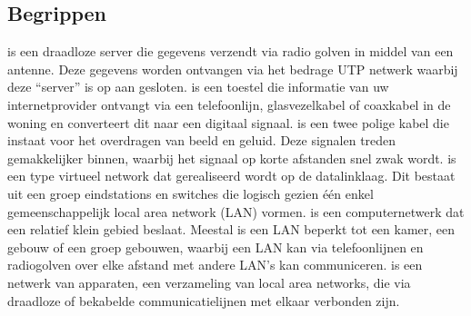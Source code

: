 \subsection{Begrippen}
 is een draadloze server die gegevens verzendt via radio golven in middel van een antenne. Deze gegevens worden ontvangen via het bedrage UTP netwerk waarbij deze “server” is op aan gesloten.
 is een toestel die informatie van uw internetprovider ontvangt via een telefoonlijn, glasvezelkabel of coaxkabel in de woning en converteert dit naar een digitaal signaal.
 is een twee polige kabel die instaat voor het overdragen van beeld en geluid. Deze signalen treden gemakkelijker binnen, waarbij het signaal op korte afstanden snel zwak wordt. 
 is een type virtueel network dat gerealiseerd wordt op de datalinklaag. Dit bestaat uit een groep eindstations en switches die logisch gezien één enkel gemeenschappelijk local area network (LAN) vormen.
 is een computernetwerk dat een relatief klein gebied beslaat. Meestal is een LAN beperkt tot een kamer, een gebouw of een groep gebouwen, waarbij een LAN kan via telefoonlijnen en radiogolven over elke afstand met andere LAN's kan communiceren.
  is een netwerk van apparaten, een verzameling van local area networks, die via draadloze of bekabelde communicatielijnen met elkaar verbonden zijn.

